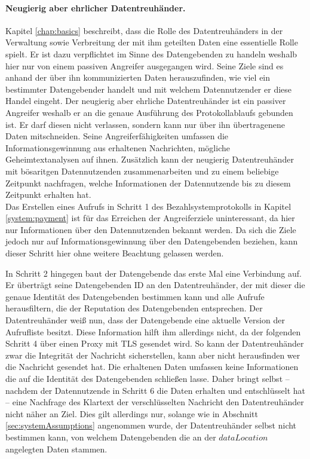 \documentclass[
	fontsize=12pt,
	headings=small,
	parskip=half,           %
	bibliography=totoc,
	numbers=noenddot,       %
	open=any,               %
]{scrreprt}
\begin{document}
\paragraph{Neugierig aber ehrlicher Datentreuhänder.}
Kapitel \ref{chap:basics} beschreibt, dass die Rolle des Datentreuhänders in der Verwaltung sowie Verbreitung der mit ihm geteilten Daten eine essentielle Rolle spielt.  Er ist dazu verpflichtet im Sinne des Datengebenden zu handeln weshalb hier nur von einem passiven Angreifer ausgegangen wird. Seine Ziele sind es anhand der über ihn kommunizierten Daten herauszufinden, wie viel ein bestimmter Datengebender handelt und mit welchem Datennutzender er diese Handel eingeht. Der neugierig aber ehrliche Datentreuhänder ist ein passiver Angreifer weshalb er an die genaue Ausführung des Protokollablaufs gebunden ist. Er darf diesen nicht verlassen, sondern kann nur über ihn übertragenene Daten mitschneiden. Seine Angreiferfähigkeiten umfassen die Informationsgewinnung aus erhaltenen Nachrichten, mögliche Geheimtextanalysen auf ihnen. Zusätzlich kann der neugierig Datentreuhänder mit bösaritgen Datennutzenden zusammenarbeiten und zu einem beliebige Zeitpunkt nachfragen, welche Informationen der Datennutzende bis zu diesem Zeitpunkt erhalten hat.\\

Das Erstellen eines Aufrufs in Schritt 1 des Bezahlsystemprotokolls in Kapitel \ref{system:payment} ist für das Erreichen der Angreiferziele uninteressant, da hier nur Informationen über den Datennutzenden bekannt werden. Da sich die Ziele jedoch nur auf Informationsgewinnung über den Datengebenden beziehen, kann dieser Schritt hier ohne weitere Beachtung gelassen werden. 

In Schritt 2 hingegen baut der Datengebende das erste Mal eine Verbindung auf. Er überträgt seine Datengebenden ID an den Datentreuhänder, der mit dieser die genaue Identität des Datengebenden bestimmen kann und alle Aufrufe herausfiltern, die der Reputation des Datengebenden entsprechen. Der Datentreuhänder weiß nun, dass der Datengebende eine aktuelle Version der Aufrufliste besitzt. Diese Information hilft ihm allerdings nicht, da der folgenden Schritt 4 über einen Proxy mit TLS gesendet wird. So kann der Datentreuhänder zwar die Integrität der Nachricht sicherstellen, kann aber nicht herausfinden wer die Nachricht gesendet hat. Die erhaltenen Daten umfassen keine Informationen die auf die Identität des Datengebenden schließen lasse. Daher bringt selbst -- nachdem der Datennutzende in Schritt 6 die Daten erhalten und entschlüsselt hat -- eine Nachfrage des Klartext der verschlüsselten Nachricht den Datentreuhänder nicht näher an Ziel. Dies gilt allerdings nur, solange wie in Abschnitt \ref{sec:systemAssumptions} angenommen wurde, der Datentreuhänder selbst nicht bestimmen kann, von welchem Datengebenden die an der $dataLocation$ angelegten Daten stammen.
\end{document}
